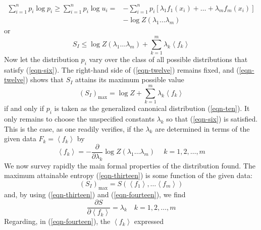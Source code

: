 \documentclass[]{article}
\begin{document}
\begin{align*}
\sum_{i = 1}^{n}   p_{i}\log p_{i} \geq \sum_{i = 1}^{n}   p_{i}\log u_{i} = &  - \sum_{i = 1}^{n}   p_{i}\left\lbrack \lambda_{1}f_{1}\left( x_{i} \right) + \ldots  + \lambda_{m}f_{m}\left( x_{i} \right) \right\rbrack \\ & - \log Z\left( \lambda_{1}\ldots\lambda_{m} \right) 
\end{align*}
%
or
%
\begin{equation}
S_{I} \leq  \log Z\left( \lambda_{1}\ldots\lambda_{m} \right) + \sum_{k = 1}^{m} \lambda_{k}\left\langle f_{k} \right\rangle \label{eqn-twelve}
\end{equation}
%
Now let the distribution \(p_{i}\) vary over the class of all possible
distributions that satisfy (\ref{eqn-six}). The right-hand side of (\ref{eqn-twelve}) remains
fixed, and (\ref{eqn-twelve}) shows that \(S_{I}\) attains its maximum possible value
%
\begin{equation}
\left( S_{I} \right)_{\max} =  \log Z + \sum_{k = 1}^{m} \lambda_{k}\left\langle f_{k} \right\rangle \label{eqn-thirteen}
\end{equation}
%
if and only if \(p_{i}\) is taken as the generalized canonical
distribution
(\ref{eqn-ten}). It only remains to choose the unspecified constants
\(\lambda_{k}\) so that (\ref{eqn-six}) is satisfied. This is the case, as one
readily verifies, if the \(\lambda_{k}\) are determined in terms of the
given data \(F_{k} = \left\langle f_{k} \right\rangle\) by
%
\begin{equation}
\left\langle f_{k} \right\rangle = - \frac{\partial}{\partial\lambda_{k}} \log Z\left( \lambda_{1}\ldots\lambda_{m} \right)\ \quad  k = 1,2,\ldots,m \label{eqn-fourteen}
\end{equation}
%
We now survey rapidly the main formal properties of the distribution
found. The maximum attainable entropy (\ref{eqn-thirteen}) is some function of the given
data:
%
\begin{equation}
\left( S_{I} \right)_{\max} = S\left( \left\langle f_{1} \right\rangle,\ldots\left\langle f_{m} \right\rangle \right)
\end{equation}
%
and, by using (\ref{eqn-thirteen}) and (\ref{eqn-fourteen}), we find
%
\begin{equation}
\frac{\partial S}{\partial\left\langle f_{k} \right\rangle} = \lambda_{k}\quad k = 1,2,\ldots,m \label{eqn-sixteen}
\end{equation}
%
Regarding, in (\ref{eqn-fourteen}), the \(\left\langle f_{k} \right\rangle\) expressed
\end{document}
